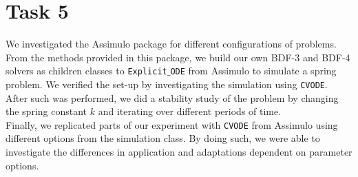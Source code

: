 \documentclass{article}
\begin{document}
\section{Task 5}
We investigated the Assimulo package for different configurations of problems. From the methods provided in this package, we build our own BDF-3 and BDF-4 solvers as children classes to \texttt{Explicit$\_$ODE} from Assimulo to simulate a spring problem. We verified the set-up by investigating the simulation using \texttt{CVODE}. After such was performed, we did a stability study of the problem by changing the spring constant $k$ and iterating over different periods of time. \\

\noindent Finally, we replicated parts of our experiment with \texttt{CVODE} from Assimulo using different options from the simulation class. By doing such, we were able to investigate the differences in application and adaptations dependent on parameter options.

\appendix
\newpage
\end{document}
